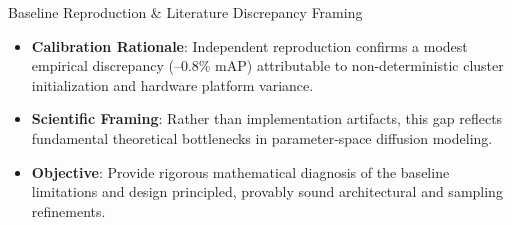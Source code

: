 \documentclass[aspectratio=169,xcolor=dvipsnames]{beamer}
\begin{document}
\begin{frame}{Baseline Reproduction \& Literature Discrepancy Framing}
\footnotesize
\vspace{-0.3em}
\begin{table}[h]
\centering
{}
\end{table}

\vspace{-0.2em}
\begin{itemize}
    \setlength{\itemsep}{0.2em}
    \item \textbf{Calibration Rationale}: Independent reproduction confirms a modest empirical discrepancy (--0.8\% mAP) attributable to non-deterministic cluster initialization and hardware platform variance.
    \item \textbf{Scientific Framing}: Rather than implementation artifacts, this gap reflects fundamental theoretical bottlenecks in parameter-space diffusion modeling.
    \item \textbf{Objective}: Provide rigorous mathematical diagnosis of the baseline limitations and design principled, provably sound architectural and sampling refinements.
\end{itemize}
\end{frame}
\end{document}
